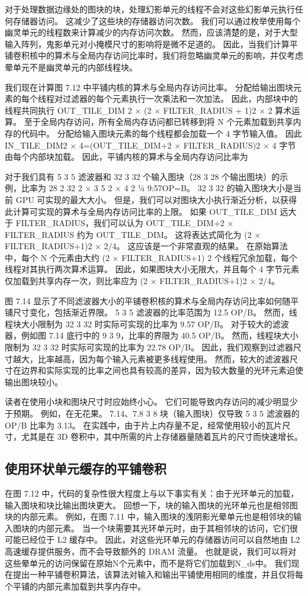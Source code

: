 对于处理数据边缘处的图块的块，处理幻影单元的线程不会对这些幻影单元执行任何存储器访问。 这减少了这些块的存储器访问次数。 我们可以通过枚举使用每个幽灵单元的线程数来计算减少的内存访问次数。 然而，应该清楚的是，对于大型输入阵列，鬼影单元对小掩模尺寸的影响将是微不足道的。 因此，当我们计算平铺卷积核中的算术与全局内存访问比率时，我们将忽略幽灵单元的影响，并仅考虑晕单元不是幽灵单元的内部线程块。

我们现在计算图 7.12 中平铺内核的算术与全局内存访问比率。 分配给输出图块元素的每个线程对过滤器的每个元素执行一次乘法和一次加法。 因此，内部块中的线程共同执行 OUT\_TILE\_DIM 2 × (2 × FILTER\_RADIUS + 1)2 × 2 算术运算。 至于全局内存访问，所有全局内存访问都已转移到将 N 个元素加载到共享内存的代码中。 分配给输入图块元素的每个线程都会加载一个 4 字节输入值。 因此 IN\_TILE\_DIM2 × 4=(OUT\_TILE\_DIM+2 × FILTER\_RADIUS)2 × 4 字节由每个内部块加载。 因此，平铺内核的算术与全局内存访问比率为

对于我们具有 5 3 5 滤波器和 32 3 32 个输入图块（28 3 28 个输出图块）的示例，比率为 28 2 32 2 × 3 5 2 × 4 2 ¼ 9:57OP=B。 32 3 32 的输入图块大小是当前 GPU 可实现的最大大小。 但是，我们可以对图块大小执行渐近分析，以获得此计算可实现的算术与全局内存访问比率的上限。 如果 OUT\_TILE\_DIM 远大于 FILTER\_RADIUS，我们可以认为 OUT\_TILE\_DIM+2 × FILTER\_RADIUS 约为 OUT\_TILE\_DIM。 这将表达式简化为 (2 × FILTER\_RADIUS+1)2 × 2/4。 这应该是一个非常直观的结果。 在原始算法中，每个 N 个元素由大约 (2 × FILTER\_RADIUS+1) 2 个线程冗余加载，每个线程对其执行两次算术运算。 因此，如果图块大小无限大，并且每个 4 字节元素仅加载到共享内存一次，则比率应为 (2 × FILTER\_RADIUS+1)2 × 2/4。

图 7.14 显示了不同滤波器大小的平铺卷积核的算术与全局内存访问比率如何随平铺尺寸变化，包括渐近界限。 5 3 5 滤波器的比率范围为 12.5 OP/B。 然而，线程块大小限制为 32 3 32 时实际可实现的比率为 9.57 OP/B。 对于较大的滤波器，例如图 7.14 底行中的 9 3 9，比率的界限为 40.5 OP/B。 然而，线程块大小限制为 32 3 32 时实际可实现的比率为 22.78 OP/B。 因此，我们观察到过滤器尺寸越大，比率越高，因为每个输入元素被更多线程使用。 然而，较大的滤波器尺寸在边界和实际实现的比率之间也具有较高的差异，因为较大数量的光环元素迫使输出图块较小。

读者在使用小块和图块尺寸时应始终小心。 它们可能导致内存访问的减少明显少于预期。 例如，在无花果。 7.14、7.8 3 8 块（输入图块）仅导致 5 3 5 滤波器的 OP/B 比率为 3.13。 在实践中，由于片上内存量不足，经常使用较小的瓦片尺寸，尤其是在 3D 卷积中，其中所需的片上存储器量随着瓦片的尺寸而快速增长。

\subsection{使用环状单元缓存的平铺卷积}
在图 7.12 中，代码的复杂性很大程度上与以下事实有关：由于光环单元的加载，输入图块和块比输出图块更大。 回想一下，块的输入图块的光环单元也是相邻图块的内部元素。 例如，在图 7.11 中，输入图块的浅阴影光晕单元也是相邻块的输入图块的内部元素。 当一个块需要其光环单元时，由于其相邻块的访问，它们很可能已经位于 L2 缓存中。 因此，对这些光环单元的存储器访问可以自然地由 L2 高速缓存提供服务，而不会导致额外的 DRAM 流量。 也就是说，我们可以将对这些晕单元的访问保留在原始N个元素中，而不是将它们加载到N\_ds中。 我们现在提出一种平铺卷积算法，该算法对输入和输出平铺使用相同的维度，并且仅将每个平铺的内部元素加载到共享内存中。

